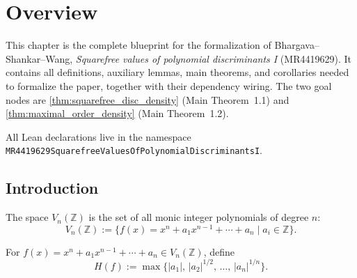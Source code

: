 \chapter{Overview}
\label{chap:overview}


This chapter is the complete blueprint for the formalization of
Bhargava--Shankar--Wang,
\textit{Squarefree values of polynomial discriminants I} (MR4419629).
It contains all definitions, auxiliary lemmas, main theorems, and
corollaries needed to formalize the paper, together with their
dependency wiring.  The two goal nodes are
\cref{thm:squarefree_disc_density} (Main Theorem~1.1) and
\cref{thm:maximal_order_density} (Main Theorem~1.2).

All Lean declarations live in the namespace
\texttt{MR4419629SquarefreeValuesOfPolynomialDiscriminantsI}.


\section{Introduction}


\begin{definition}
  \label{def:monic_poly_space}
  \uses{}
  The space \(V_n(\mathbb{Z})\) is the set of all monic integer
  polynomials of degree \(n\):
  \[
    V_n(\mathbb{Z}) := \bigl\{f(x)=x^n+a_1x^{n-1}+\cdots+a_n
    \mid a_i\in\mathbb{Z}\bigr\}.
  \]
\end{definition}

\begin{definition}[Height]
  \label{def:height}
  For \(f(x)=x^n+a_1x^{n-1}+\cdots+a_n\in V_n(\mathbb{Z})\), define
  \[
    H(f):=\max\bigl\{|a_1|,\,|a_2|^{1/2},\,\ldots,\,|a_n|^{1/n}\bigr\}.
  \]
\end{definition}

